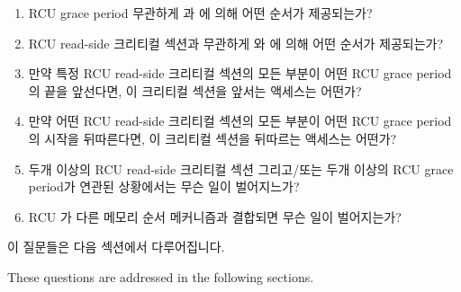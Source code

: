 \fi

\begin{enumerate}
\item	RCU grace period 무관하게  과
	 에 의해 어떤 순서가 제공되는가?
\item	RCU read-side 크리티컬 섹션과 무관하게  와
	 에 의해 어떤 순서가 제공되는가?
\item	만약 특정 RCU read-side 크리티컬 섹션의 모든 부분이 어떤 RCU grace
	period 의 끝을 앞선다면, 이 크리티컬 섹션을 앞서는 액세스는 어떤가?
\item	만약 어떤 RCU read-side 크리티컬 섹션의 모든 부분이 어떤 RCU grace
	period 의 시작을 뒤따른다면, 이 크리티컬 섹션을 뒤따르는 액세스는
	어떤가?
\item	두개 이상의 RCU read-side 크리티컬 섹션 그리고/또는 두개 이상의 RCU
	grace period가 연관된 상황에서는 무슨 일이 벌어지느가?
\item	RCU 가 다른 메모리 순서 메커니즘과 결합되면 무슨 일이 벌어지는가?

\end{enumerate}

이 질문들은 다음 섹션에서 다루어집니다.

\iffalse

These questions are addressed in the following sections.

